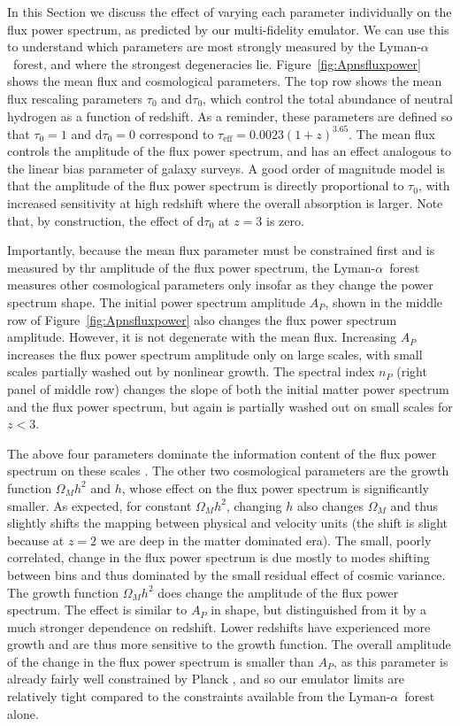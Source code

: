 \documentclass[a4paper,11pt]{article}
\newcommand{\Lya}{Lyman-$\alpha$}
\begin{document}
In this Section we discuss the effect of varying each parameter individually on the flux power spectrum, as predicted by our multi-fidelity emulator. We can use this to understand which parameters are most strongly measured by the \Lya~forest, and where the strongest degeneracies lie. Figure~\ref{fig:Apnsfluxpower} shows the mean flux and cosmological parameters. The top row shows the mean flux rescaling parameters $\tau_0$ and d$\tau_0$, which control the total abundance of neutral hydrogen as a function of redshift. As a reminder, these parameters are defined so that  $\tau_0 = 1$ and d$\tau_0 = 0$ correspond to $\tau_\mathrm{eff} = 0.0023 (1+z)^{3.65}$. The mean flux controls the amplitude of the flux power spectrum, and has an effect analogous to the linear bias parameter of galaxy surveys. A good order of magnitude model is that the amplitude of the flux power spectrum is directly proportional to $\tau_0$, with increased sensitivity at high redshift where the overall absorption is larger. Note that, by construction, the effect of d$\tau_0$ at $z=3$ is zero.

Importantly, because the mean flux parameter must be constrained first and is measured by thr amplitude of the flux power spectrum, the \Lya~forest measures other cosmological parameters only insofar as they change the power spectrum shape. The initial power spectrum  amplitude $A_P$, shown in the middle row of Figure~\ref{fig:Apnsfluxpower} also changes the flux power spectrum amplitude. However, it is not degenerate with the mean flux. Increasing $A_P$ increases the flux power spectrum amplitude only on large scales, with small scales partially washed out by nonlinear growth. The spectral index $n_P$ (right panel of middle row) changes the slope of both the initial matter power spectrum and the flux power spectrum, but again is partially washed out on small scales for $z < 3$.

The above four parameters dominate the information content of the flux power spectrum on these scales \cite{Pedersen:2022}. The other two cosmological parameters are the growth function $\Omega_M h^2$ and $h$, whose effect on the flux power spectrum is significantly smaller. As expected, for constant $\Omega_M h^2$, changing $h$ also changes $\Omega_M$ and thus slightly shifts the mapping between physical and velocity units (the shift is slight because at $z=2$ we are deep in the matter dominated era). The small, poorly correlated, change in the flux power spectrum is due mostly to modes shifting between bins and thus dominated by the small residual effect of cosmic variance. The growth function $\Omega_M h^2$ does change the amplitude of the flux power spectrum. The effect is similar to $A_P$ in shape, but distinguished from it by a much stronger dependence on redshift. Lower redshifts have experienced more growth and are thus more sensitive to the growth function. The overall amplitude of the change in the flux power spectrum is smaller than $A_P$, as this parameter is already fairly well constrained by Planck \cite{Planck:2018}, and so our emulator limits are relatively tight compared to the constraints available from the \Lya~forest alone.
\end{document}
